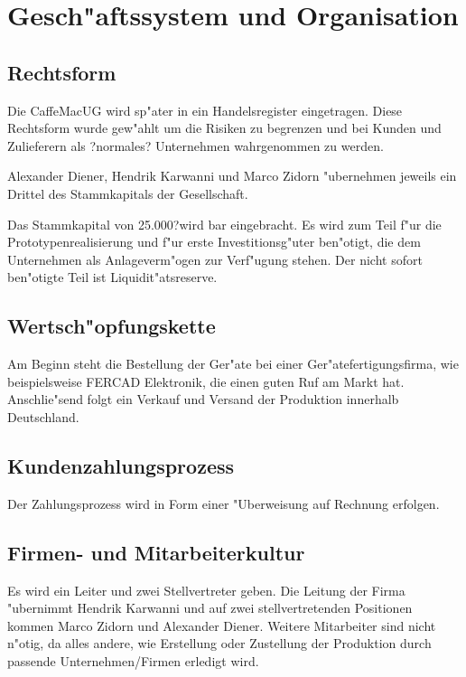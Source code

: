 \section{Gesch"aftssystem und Organisation}

\def \name {CaffeMac}
\def \startkapital {25.000?}

\subsection{Rechtsform}
Die \name UG wird sp"ater in ein Handelsregister eingetragen. Diese Rechtsform wurde gew"ahlt um die Risiken
zu begrenzen und bei Kunden und Zulieferern als ?normales? Unternehmen wahrgenommen zu werden.

Alexander Diener, Hendrik Karwanni und Marco Zidorn "ubernehmen jeweils ein Drittel des Stammkapitals der Gesellschaft.

Das Stammkapital von \startkapital wird bar eingebracht. Es wird zum Teil f"ur die Prototypenrealisierung und f"ur erste Investitionsg"uter ben"otigt, die dem Unternehmen als Anlageverm"ogen zur Verf"ugung stehen. Der nicht sofort ben"otigte Teil ist Liquidit"atsreserve.

\subsection{Wertsch"opfungskette}
Am Beginn steht die Bestellung der Ger"ate bei einer Ger"atefertigungsfirma, wie beispielsweise FERCAD Elektronik, die einen guten Ruf am Markt hat. Anschlie"send folgt ein Verkauf und Versand der Produktion innerhalb Deutschland.

\subsection{Kundenzahlungsprozess}
Der Zahlungsprozess wird in Form einer "Uberweisung auf Rechnung erfolgen.

\subsection{Firmen- und Mitarbeiterkultur}
Es wird ein Leiter und zwei Stellvertreter geben.
Die Leitung der Firma "ubernimmt Hendrik Karwanni und auf zwei stellvertretenden Positionen kommen Marco Zidorn und Alexander Diener.
Weitere Mitarbeiter sind nicht n"otig, da alles andere, wie Erstellung oder Zustellung der Produktion durch passende Unternehmen/Firmen erledigt wird.